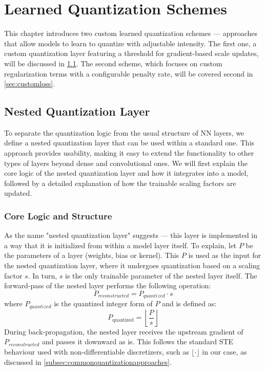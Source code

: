 \chapter{Learned Quantization\label{cha:chapter3} Schemes}
\hspace*{1em}This chapter introduces two custom learned quantization schemes — approaches that allow models to learn to quantize
with adjustable intensity. The first one, a custom quantization layer featuring a threshold for gradient-based scale updates,
will be discussed in \cref{sec:nestedquantizationlayer}. The second scheme, which focuses on custom regularization terms with a configurable penalty rate,
will be covered second in \cref{sec:customloss}.


\section{Nested Quantization Layer}
\label{sec:nestedquantizationlayer}
\hspace*{1em}To separate the quantization logic from the usual structure of NN layers,
we define a nested quantization layer that can be used within a standard one. 
This approach provides usability, making it easy to extend the functionality to other types of layers beyond dense and convolutional ones.
We will first explain the core logic of the nested quantization layer and how it integrates into a model,
followed by a detailed explanation of how the trainable scaling factors are updated.



\subsection{Core Logic and Structure}
\label{subsec:corelogicandstructure}

\hspace*{1em}As the name "nested quantization layer" suggests —
this layer is implemented in a way that it is initialized from within a model layer itself.
To explain, let \( P \) be the parameters of a layer (weights, bias or kernel). This \( P \) is used
as the input for the nested quantization layer, where it undergoes quantization based on 
a scaling factor \( s \). In turn, \( s \) is the only trainable parameter of the nested layer itself.
The forward-pass of the nested layer performs the following operation:
\[
  P_{reconstructed} = P_{quantized} \cdot s
\]
where \( P_{quantized} \) is the quantized integer form of \( P \) and is defined as:
\[
  P_{\text{quantized}} = \left\lfloor \frac{P}{s} \right\rfloor
\]
During back-propagation, the nested layer receives the upstream gradient of
\( P_{reconstructed} \) and passes it downward as is.  This follows the standard STE behaviour
used with non-differentiable discretizers, such as \(  \lfloor \cdot \rfloor\) in our case,
as discussed in \cref{subsec:commonquantizationapproaches}.

